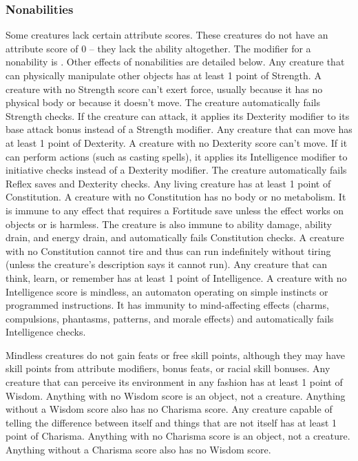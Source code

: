 {\subsubsection{Nonabilities} Some creatures lack certain attribute scores. These creatures do not have an attribute score of 0 -- they lack the ability altogether. The modifier for a nonability is . Other effects of nonabilities are detailed below.
 Any creature that can physically manipulate other objects has at least 1 point of Strength. A creature with no Strength score can't exert force, usually because it has no physical body or because it doesn't move. The creature automatically fails Strength checks. If the creature can attack, it applies its Dexterity modifier to its base attack bonus instead of a Strength modifier.
 Any creature that can move has at least 1 point of Dexterity. A creature with no Dexterity score can't move. If it can perform actions (such as casting spells), it applies its Intelligence modifier to initiative checks instead of a Dexterity modifier. The creature automatically fails Reflex saves and Dexterity checks.
 Any living creature has at least 1 point of Constitution. A creature with no Constitution has no body or no metabolism. It is immune to any effect that requires a Fortitude save unless the effect works on objects or is harmless. The creature is also immune to ability damage, ability drain, and energy drain, and automatically fails Constitution checks. A creature with no Constitution cannot tire and thus can run indefinitely without tiring (unless the creature's description says it cannot run).
 Any creature that can think, learn, or remember has at least 1 point of Intelligence. A creature with no Intelligence score is mindless, an automaton operating on simple instincts or programmed instructions. It has immunity to mind-affecting effects (charms, compulsions, phantasms, patterns, and morale effects) and automatically fails Intelligence checks.
\par Mindless creatures do not gain feats or free skill points, although they may have skill points from attribute modifiers, bonus feats, or racial skill bonuses.
 Any creature that can perceive its environment in any fashion has at least 1 point of Wisdom. Anything with no Wisdom score is an object, not a creature. Anything without a Wisdom score also has no Charisma score.
 Any creature capable of telling the difference between itself and things that are not itself has at least 1 point of Charisma. Anything with no Charisma score is an object, not a creature. Anything without a Charisma score also has no Wisdom score.

}
